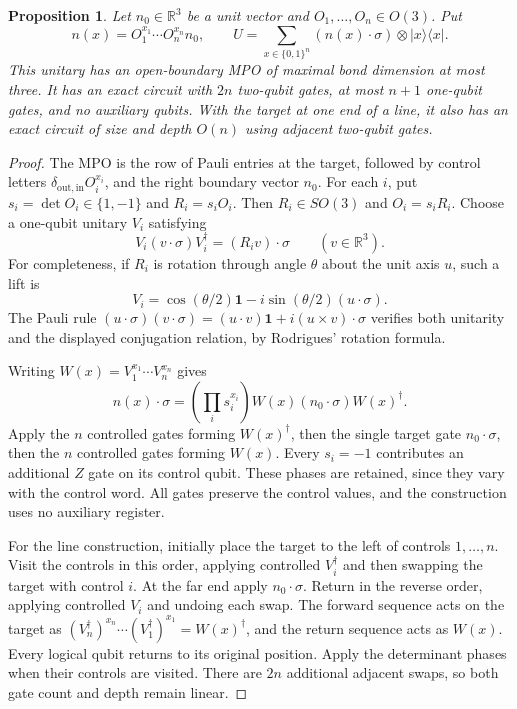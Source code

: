 \documentclass[11pt]{article}
\newtheorem{proposition}{Proposition}
\newcommand{\id}{\mathbf 1}
\begin{document}
\begin{proposition}\label{prop:orthogonal-walk}
Let $n_0\in\mathbb R^3$ be a unit vector and
$O_1,\ldots,O_n\in O(3)$. Put
\[
 n(x)=O_1^{x_1}\cdots O_n^{x_n}n_0,
 \qquad
 U=\sum_{x\in\{0,1\}^n}
   (n(x)\cdot\sigma)\otimes|x\rangle\langle x|.
\]
This unitary has an open-boundary MPO of maximal bond dimension at
most three. It has an exact circuit with $2n$ two-qubit gates,
at most $n+1$ one-qubit gates, and no auxiliary qubits.
With the target at one end of a line, it also has an exact circuit
of size and depth $O(n)$ using adjacent two-qubit gates.
\end{proposition}
\begin{proof}
The MPO is the row of Pauli entries at the target, followed by
control letters $\delta_{\mathrm{out},\mathrm{in}}O_i^{x_i}$,
and the right boundary vector $n_0$.
For each $i$, put $s_i=\det O_i\in\{1,-1\}$ and $R_i=s_iO_i$.
Then $R_i\in SO(3)$ and $O_i=s_iR_i$.
Choose a one-qubit unitary $V_i$ satisfying
\[
 V_i(v\cdot\sigma)V_i^\dagger=(R_iv)\cdot\sigma
 \qquad(v\in\mathbb R^3).
\]
For completeness, if $R_i$ is rotation through angle $\theta$ about
the unit axis $u$, such a lift is
\[
 V_i=\cos(\theta/2)\id-i\sin(\theta/2)(u\cdot\sigma).
\]
The Pauli rule
$(u\cdot\sigma)(v\cdot\sigma)=(u\cdot v)\id+
i(u\times v)\cdot\sigma$ verifies both unitarity and the displayed
conjugation relation, by Rodrigues' rotation formula.

Writing $W(x)=V_1^{x_1}\cdots V_n^{x_n}$ gives
\[
 n(x)\cdot\sigma
   =\left(\prod_i s_i^{x_i}\right)
       W(x)(n_0\cdot\sigma)W(x)^\dagger.
\]
Apply the $n$ controlled gates forming $W(x)^\dagger$, then the
single target gate $n_0\cdot\sigma$, then the $n$ controlled gates
forming $W(x)$. Every $s_i=-1$ contributes an additional $Z$ gate
on its control qubit. These phases are retained, since they vary
with the control word. All gates preserve the control values, and
the construction uses no auxiliary register.

For the line construction, initially place the target to the left of
controls $1,\ldots,n$. Visit the controls in this order, applying
controlled $V_i^\dagger$ and then swapping the target with control $i$.
At the far end apply $n_0\cdot\sigma$. Return in the reverse order,
applying controlled $V_i$ and undoing each swap. The forward sequence
acts on the target as
$(V_n^\dagger)^{x_n}\cdots(V_1^\dagger)^{x_1}=W(x)^\dagger$,
and the return sequence acts as $W(x)$. Every logical qubit returns
to its original position. Apply the determinant phases when their
controls are visited. There are $2n$ additional adjacent swaps,
so both gate count and depth remain linear.
\end{proof}
\end{document}
